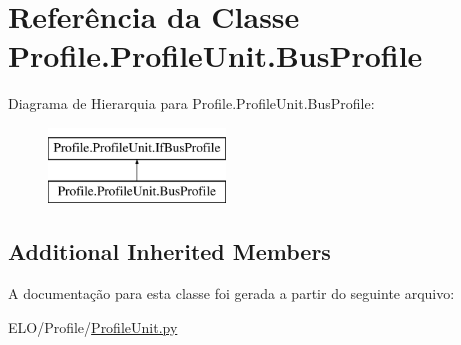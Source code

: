 \hypertarget{classProfile_1_1ProfileUnit_1_1BusProfile}{\section{Referência da Classe Profile.\-Profile\-Unit.\-Bus\-Profile}
\label{df/da4/classProfile_1_1ProfileUnit_1_1BusProfile}
}
Diagrama de Hierarquia para Profile.\-Profile\-Unit.\-Bus\-Profile\-:\begin{figure}[H]
\begin{center}
\leavevmode
\includegraphics[height=2.000000cm]{df/da4/classProfile_1_1ProfileUnit_1_1BusProfile}
\end{center}
\end{figure}
\subsection*{Additional Inherited Members}


A documentação para esta classe foi gerada a partir do seguinte arquivo\-:\begin{DoxyCompactItemize}
\item 
E\-L\-O/\-Profile/\hyperlink{ProfileUnit_8py}{Profile\-Unit.\-py}\end{DoxyCompactItemize}
